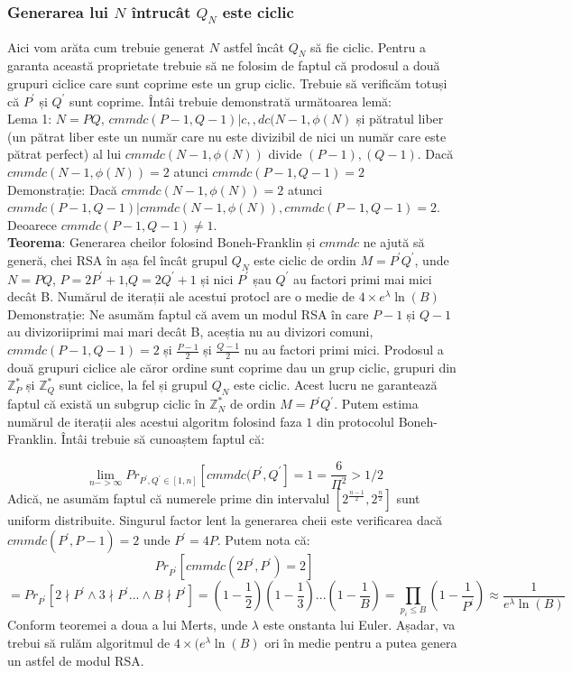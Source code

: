 \documentclass[12]{report}
\begin{document}
\subsubsection{Generarea lui $N$ întrucât $Q_N$ este ciclic}
Aici vom arăta cum trebuie generat $N$ astfel încât $Q_N$ să fie ciclic. Pentru a garanta această proprietate trebuie să ne folosim de faptul că prodosul a două grupuri ciclice care sunt coprime este un grup ciclic. Trebuie să verificăm totuși că $P^{'}$ și $Q^{'}$ sunt coprime. Întâi trebuie demonstrată următoarea lemă: \\
Lema 1: $N=PQ$, $cmmdc(P-1,Q-1)|c,,dc(N-1,\phi(N)$ și pătratul liber (un pătrat liber este un număr care nu este divizibil de nici un număr care este pătrat perfect) al lui $cmmdc(N-1,\phi(N))$ divide $(P-1),(Q-1)$. Dacă $cmmdc(N-1,\phi(N))=2$ atunci $cmmdc(P-1,Q-1)=2$ \\
Demonstrație: Dacă $cmmdc(N-1,\phi(N))=2$ atunci $cmmdc(P-1,Q-1)|cmmdc(N-1,\phi(N)), cmmdc(P-1,Q-1)=2$. Deoarece $cmmdc(P-1,Q-1) \neq 1$.\\
\textbf{Teorema}: Generarea cheilor folosind Boneh-Franklin și $cmmdc$ ne ajută să generă, chei RSA în așa fel încât grupul $Q_N$ este ciclic de ordin $M=P^{'}Q^{'}$, unde $N=PQ$, $P=2P^{'}+1$,$Q=2Q^{'}+1$ și nici $P^{'}$ șau $Q^{'}$ au factori primi mai mici decât B. Numărul de iterații ale acestui protocl are o medie de $ 4 \times e^{\lambda} \ln(B)$ \\
Demonstrație: Ne asumăm faptul că avem un modul RSA în care $P-1$ și $Q-1$ au divizoriiprimi mai mari decât B, aceștia nu au divizori comuni, $cmmdc(P-1,Q-1) = 2$ și $\frac{P-1}{2}$ și $\frac{Q-1}{2}$ nu au factori primi mici. Prodosul a două grupuri ciclice ale căror ordine sunt coprime dau un grup ciclic, grupuri din $\mathbb{Z}_{P}^{*}$ și $\mathbb{Z}_{Q}^{*}$ sunt ciclice, la fel și grupul $Q_N$ este ciclic. Acest lucru ne garantează faptul că există un subgrup ciclic în $\mathbb{Z}_{N}^{*}$ de ordin $M=P^{'}Q^{'}$. Putem estima numărul de iterații ales acestui algoritm folosind faza $1$ din protocolul Boneh-Franklin. Întâi trebuie să cunoaștem faptul că:

$$\lim_{n-> \infty} Pr_{P^{'},Q^{'}  \in [1,n] } [cmmdc(P^{'},Q^{'}]= 1 =  \frac{6}{\Pi^{2}} > 1/2 $$ 
Adică, ne asumăm faptul că numerele prime din intervalul $ \left[  2^{\frac{n-1}{2}}, 2^{\frac{n}{2}}         \right] $ sunt uniform distribuite. Singurul factor lent la generarea cheii este verificarea dacă $cmmdc(P^{'},P-1)=2$ unde $P^{'} = 4P$. Putem nota că:
$$Pr_{P^{'}}[ cmmdc(2P^{'},P^{'}) =2 ]$$
$$ = Pr_{P^{'}} [2 \nmid P^{'} \wedge 3 \nmid P^{'} ...   \wedge B \nmid P^{'} ] =(1- \frac{1}{2})(1 - \frac{1}{3})...(1- \frac{1}{B}) = \prod_{p_i \leqslant B}^{} (1- \frac{1}{P^i}) \approx \frac{1}{e^{\lambda} \ln(B)}  $$
Conform teoremei a doua a lui Merts, unde $\lambda$ este onstanta lui Euler. Așadar, va trebui să rulăm algoritmul de $ 4 \times (e^{\lambda} \ln(B)$ ori în medie pentru a putea genera un astfel de modul RSA. 
\end{document}
